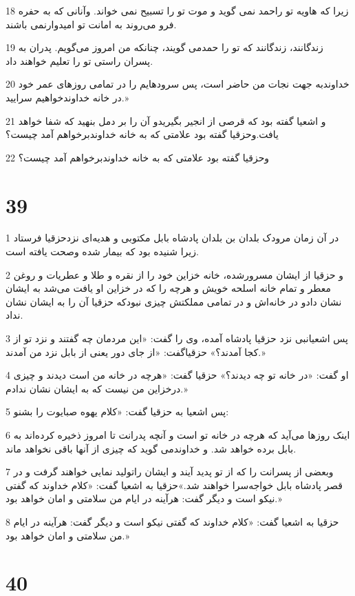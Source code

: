 \par 18 زیرا که هاویه تو راحمد نمی گوید و موت تو را تسبیح نمی خواند. وآنانی که به حفره فرو می‌روند به امانت تو امیدوارنمی باشند.
\par 19 زندگانند، زندگانند که تو را حمدمی گویند، چنانکه من امروز می‌گویم. پدران به پسران راستی تو را تعلیم خواهند داد.
\par 20 خداوندبه جهت نجات من حاضر است، پس سرودهایم را در تمامی روزهای عمر خود در خانه خداوندخواهیم سرایید.»
\par 21 و اشعیا گفته بود که قرصی از انجیر بگیریدو آن را بر دمل بنهید که شفا خواهد یافت.وحزقیا گفته بود علامتی که به خانه خداوندبرخواهم آمد چیست؟
\par 22 وحزقیا گفته بود علامتی که به خانه خداوندبرخواهم آمد چیست؟
 
\chapter{39}

\par 1 در آن زمان مرودک بلدان بن بلدان پادشاه بابل مکتوبی و هدیه‌ای نزدحزقیا فرستاد زیرا شنیده بود که بیمار شده وصحت یافته است.
\par 2 و حزقیا از ایشان مسرورشده، خانه خزاین خود را از نقره و طلا و عطریات و روغن معطر و تمام خانه اسلحه خویش و هرچه را که در خزاین او یافت می‌شد به ایشان نشان دادو در خانه‌اش و در تمامی مملکتش چیزی نبودکه حزقیا آن را به ایشان نشان نداد.
\par 3 پس اشعیانبی نزد حزقیا پادشاه آمده، وی را گفت: «این مردمان چه گفتند و نزد تو از کجا آمدند؟» حزقیاگفت: «از جای دور یعنی از بابل نزد من آمدند.»
\par 4 او گفت: «در خانه تو چه دیدند؟» حزقیا گفت: «هرچه در خانه من است دیدند و چیزی درخزاین من نیست که به ایشان نشان ندادم.»
\par 5 پس اشعیا به حزقیا گفت: «کلام یهوه صبایوت را بشنو:
\par 6 اینک روزها می‌آید که هرچه در خانه تو است و آنچه پدرانت تا امروز ذخیره کرده‌اند به بابل برده خواهد شد. و خداوندمی گوید که چیزی از آنها باقی نخواهد ماند.
\par 7 وبعضی از پسرانت را که از تو پدید آیند و ایشان راتولید نمایی خواهند گرفت و در قصر پادشاه بابل خواجه‌سرا خواهند شد.»حزقیا به اشعیا گفت: «کلام خداوند که گفتی نیکو است و دیگر گفت: هرآینه در ایام من سلامتی و امان خواهد بود.»
\par 8 حزقیا به اشعیا گفت: «کلام خداوند که گفتی نیکو است و دیگر گفت: هرآینه در ایام من سلامتی و امان خواهد بود.»
 
\chapter{40}

